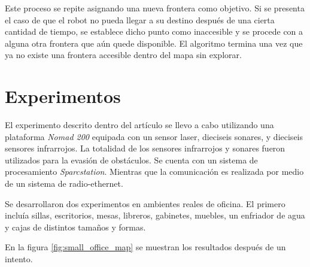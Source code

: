 \documentclass[11pt]{article}
\begin{document}
Este proceso se repite asignando una nueva frontera como objetivo. Si se presenta el caso de que el robot no pueda llegar a su destino después de una cierta cantidad de tiempo, se establece dicho punto como inaccesible y se procede con a alguna otra frontera que aún quede disponible. El algoritmo termina una vez que ya no existe una frontera accesible dentro del mapa sin explorar.

\section{Experimentos}

El experimento descrito dentro del artículo se llevo a cabo utilizando una plataforma \emph{Nomad 200} equipada con un sensor laser, dieciseis sonares, y dieciseis sensores infrarrojos. La totalidad de los sensores infrarrojos y sonares fueron utilizados para la evasión de obstáculos. Se cuenta con un sistema de procesamiento \emph{Sparcstation}. Mientras que la comunicación es realizada por medio de un sistema de radio-ethernet.

Se desarrollaron dos experimentos en ambientes reales de oficina. El primero incluía sillas, escritorios, mesas, libreros, gabinetes, muebles, un enfriador de agua y cajas de distintos tamaños y formas.

En la figura \ref{fig:small_office_map} se muestran los resultados después de un intento.
\end{document}
